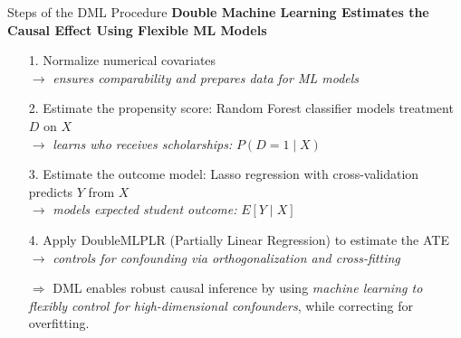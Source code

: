 \documentclass[aspectratio=169]{beamer}
\begin{document}
\begin{frame}{Steps of the DML Procedure}
\textbf{Double Machine Learning Estimates the Causal Effect Using Flexible ML Models}
\vspace{-3pt}
\begin{itemize}
    \item[1.] Normalize numerical covariates \\ 
    $\rightarrow$ \textit{ensures comparability and prepares data for ML models}
    \item[2.] Estimate the propensity score: Random Forest classifier models treatment $D$ on $X$ \\ 
    $\rightarrow$ \textit{learns who receives scholarships: } $P(D = 1 \mid X)$  
    \item[3.] Estimate the outcome model: Lasso regression with cross-validation predicts $Y$ from $X$ \\ 
    $\rightarrow$ \textit{models expected student outcome: } $E[Y \mid X]$
    \item[4.] Apply DoubleMLPLR (Partially Linear Regression) to estimate the ATE \\ 
    $\rightarrow$ \textit{controls for confounding via orthogonalization and cross-fitting}
\end{itemize}
\vspace{-3pt}
\begin{itemize}
    \item[$\Rightarrow$] DML enables robust causal inference by using \textit{machine learning to flexibly control for high-dimensional confounders}, while correcting for overfitting.
\end{itemize}
\vspace{-10pt}
\end{frame}
\end{document}
